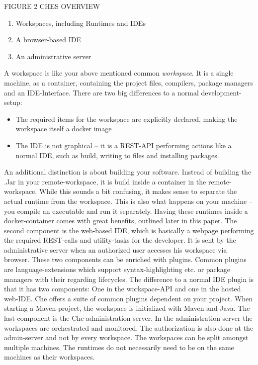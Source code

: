 \documentclass[utf8,biblatex]{lni}
\begin{document}
FIGURE 2 CHES OVERVIEW

\begin{enumerate}
	\item Workspaces, including Runtimes and IDEs
	\item A browser-based IDE
	\item An administrative server
\end{enumerate}
A workspace is like your above mentioned common \textit{workspace}. 
It is a single machine, as a container, containing the project files, compilers, package managers and an IDE-Interface. 
There are two big differences to a normal development-setup:
\begin{itemize}
	\item The required items for the workspace are explicitly  declared, making  the  workspace itself a docker image
	\item The IDE is not graphical – it is a REST-API performing actions like a normal IDE, such as build, writing to files and installing packages.  
\end{itemize}
An additional distinction is about building your software.
Instead of building the .Jar in your remote-workspace, it is build inside a container in the remote-workspace.
While this sounds a bit confusing, it makes sense to separate the actual runtime from the workspace. 
This is also what happens on your machine – you compile an executable and run it separately. 
Having these runtimes inside a docker-container comes with great benefits, outlined later in this paper.
The second component is the web-based IDE, which is basically a webpage performing the required REST-calls and utility-tasks for the developer. 
It is sent by the administrative server when an authorized user accesses his workspace via browser. 
These two components can be enriched with plugins.  
Common plugins are language-extensions which support syntax-highlighting etc. or package managers with their regarding lifecycles.
The difference to a normal IDE plugin is that it has two components: 
One in the workspace-API and one in the hosted web-IDE.  
Che offers a suite of common plugins dependent on your project. 
When starting a Maven-project, the workspace is initialized with Maven and Java.
The last component is the Che-administration server. 
In the administration-server the workspaces are orchestrated and monitored. 
The authorization is also done at the admin-server and not by every workspace.
The workspaces can be split amongst multiple machines.
The runtimes do not necessarily need to be on the same machines as their workspaces. 
\end{document}
